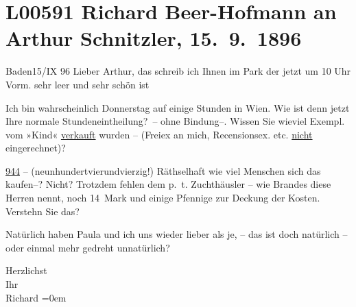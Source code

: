 

\section[Richard Beer-Hofmann an Arthur Schnitzler, 15. 9. 1896]{L00591 Richard Beer-Hofmann an Arthur Schnitzler, 15. 9. 1896}
\nopagebreak{}
\rehead{ }\normalsize\beginnumbering{}
\toendnotes[C]{\smallbreak\pagebreak[2]}
\pstart
           {\pb}Baden15/IX 96\pend
           \vspace{0.5em}
\pstart
           Lieber Arthur, das schreib ich Ihnen im Park der jetzt um 10
                  Uhr Vorm. sehr leer und sehr schön ist\pend
           
\pstart
           Ich bin wahrscheinlich Donnerstag auf einige Stunden in Wien. Wie ist denn jetzt Ihre normale Stundeneintheilung? – ohne
                  {\pb}Bindung–. Wissen Sie wieviel
               Exempl. vom »Kind« \uline{verkauft} wurden – (Freiex an mich, Recensionsex. etc. \uline{nicht} eingerechnet)?\pend
           
\pstart
           \uline{944} – (neunhundertvierundvierzig!) Räthselhaft wie
               viel Menschen sich das kaufen–? Nicht? Trotzdem {\pb}fehlen dem p. t. Zuchthäusler – wie
                  Brandes diese Herren nennt, noch 14 Mark
               und einige Pfennige zur Deckung der Kosten. Verstehn Sie das?\pend
           
\pstart
           Natürlich haben Paula und ich uns wieder
               lieber als {\pb}je, – das ist doch
               natürlich – oder  einmal mehr gedreht
               unnatürlich?\pend
           
\pstart
           Herzlichst{\\[\baselineskip]}Ihr{\\[\baselineskip]}\spacefill\mbox{Richard}\pend
           \leftskip=0em{}\endnumbering{}  
      